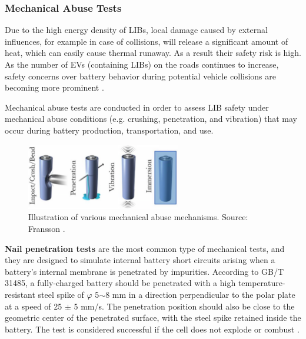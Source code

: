 \subsubsection{Mechanical Abuse Tests}
\label{sec:mechanical-abuse-tests}
Due to the high energy density of LIBs, local damage caused by external influences, for example in case of collisions, will release a significant amount of heat, which can easily cause thermal runaway. As a result their safety risk is high. As the number of EVs (containing LIBs) on the roads continues to increase, safety concerns over battery behavior during potential vehicle collisions are becoming more prominent \cite{chen2021review}.

Mechanical abuse tests are conducted in order to assess LIB safety under mechanical abuse conditions (e.g. crushing, penetration, and vibration) that may occur during battery production, transportation, and use.

\begin{figure}[ht]
    \centering
    \includegraphics[width=0.6\textwidth]{Images/Chapter2/mechanical-failure.png}
    \caption[Illustration of various mechanical abuse mechanisms]{Illustration of various mechanical abuse mechanisms. Source: Fransson \cite{fransson2024phd}.}
    \label{fig:mechanical-failure}
\end{figure}

\textbf{Nail penetration tests} are the most common type of mechanical tests, and they are designed to simulate internal battery short circuits arising when a battery's internal membrane is penetrated by impurities. According to GB/T 31485, a fully-charged battery should be penetrated with a high temperature-resistant steel spike of $\varphi$ 5$\sim$8 mm in a direction perpendicular to the polar plate at a speed of 25 $\pm$ 5 mm/s. The penetration position should also be close to the geometric center of the penetrated surface, with the steel spike retained inside the battery. The test is considered successful if the cell does not explode or combust \cite{chen2021review}.

